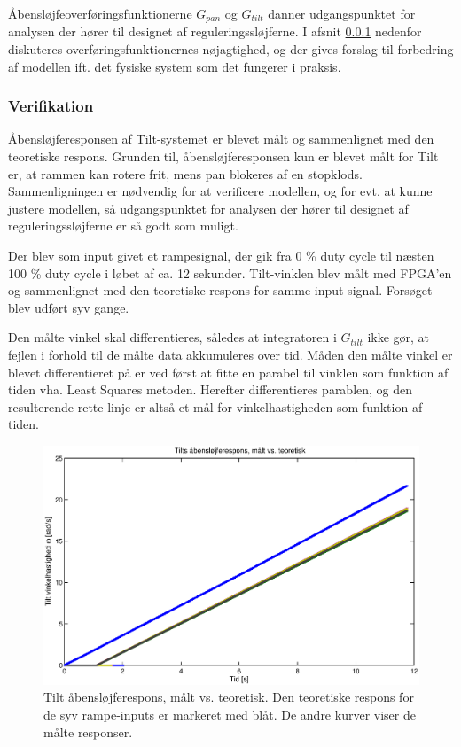 Åbensløjfeoverføringsfunktionerne \(G_{pan}\) og \(G_{tilt}\) danner udgangspunktet
for analysen der hører til designet af reguleringssløjferne.
I afsnit \ref{subsec:verifikation} nedenfor diskuteres overføringsfunktionernes nøjagtighed,
og der gives forslag til forbedring af modellen ift. det fysiske system som det fungerer
i praksis.

\subsubsection{Verifikation}
\label{subsec:verifikation}
Åbensløjferesponsen af Tilt-systemet er blevet målt og sammenlignet med den teoretiske respons.
Grunden til, åbensløjferesponsen kun er blevet målt for Tilt er, at rammen kan rotere frit,
mens pan blokeres af en stopklods.
Sammenligningen er nødvendig for at verificere modellen, og for evt. at kunne justere modellen,
så udgangspunktet for analysen der hører til designet af reguleringssløjferne er så godt som muligt.

Der blev som input givet et rampesignal, der gik fra 0 \% duty cycle til næsten 100 \% duty cycle
i løbet af ca. 12 sekunder. Tilt-vinklen blev målt med FPGA'en og sammenlignet med den teoretiske
respons for samme input-signal.
Forsøget blev udført syv gange.

Den målte vinkel skal differentieres, således at integratoren i \(G_{tilt}\) ikke gør,
at fejlen i forhold til de målte data akkumuleres over tid.
Måden den målte vinkel er blevet differentieret på er ved først at fitte en parabel
til vinklen som funktion af tiden vha. Least Squares metoden. Herefter differentieres
parablen, og den resulterende rette linje er altså et mål for vinkelhastigheden som funktion af tiden.

\begin{figure}[th!]
	\centering
	\includegraphics[width=1\textwidth]{./graphics/openloopVelocity1.eps}
	\caption[Tilt åbensløjferespons, målt vs. teoretisk]
		{Tilt åbensløjferespons, målt vs. teoretisk.
		Den teoretiske respons for de syv rampe-inputs er markeret med blåt.
		De andre kurver viser de målte responser.}
	\label{fig:openloopV1}
\end{figure}

